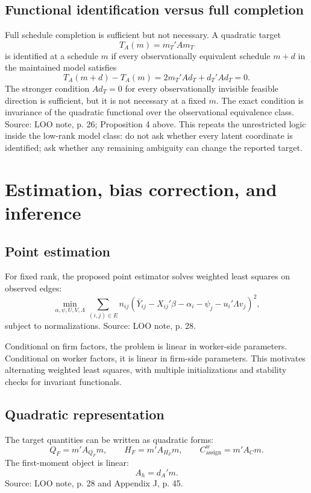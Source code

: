 \documentclass[11pt]{article}
\begin{document}
\subsection{Functional identification versus full completion}

Full schedule completion is sufficient but not necessary. A quadratic target
\[
T_A(m)=m_T' A m_T
\]
is identified at a schedule \(m\) if every observationally equivalent schedule
\(m+d\) in the maintained model satisfies
\[
T_A(m+d)-T_A(m)
=2m_T'Ad_T+d_T'Ad_T=0.
\tag{functional-invariance}
\]
The stronger condition \(Ad_T=0\) for every observationally invisible feasible
direction is sufficient, but it is not necessary at a fixed \(m\).  The exact
condition is invariance of the quadratic functional over the observational
equivalence class.  Source: LOO note, p. 26; Proposition 4 above.  This repeats
the unrestricted logic inside the low-rank model class: do not ask whether
every latent coordinate is identified; ask whether any remaining ambiguity can
change the reported target.

\section{Estimation, bias correction, and inference}

\subsection{Point estimation}

For fixed rank, the proposed point estimator solves weighted least squares on
observed edges:
\[
\min_{\alpha,\psi,U,V,\Lambda}
\sum_{(i,j)\in E}
n_{ij}\left(\bar Y_{ij}-X_{ij}'\beta-\alpha_i-\psi_j-u_i'\Lambda v_j\right)^2,
\]
subject to normalizations. Source: LOO note, p. 28.

Conditional on firm factors, the problem is linear in worker-side parameters.
Conditional on worker factors, it is linear in firm-side parameters. This
motivates alternating weighted least squares, with multiple initializations and
stability checks for invariant functionals.

\subsection{Quadratic representation}

The target quantities can be written as quadratic forms:
\[
Q_F=m'A_{Q_F}m,\qquad
H_F=m'A_{H_F}m,\qquad
C^w_{\mathrm{assign}}=m'A_Cm.
\]
The first-moment object is linear:
\[
A_h=d_A'm.
\]
Source: LOO note, p. 28 and Appendix J, p. 45.
\end{document}
